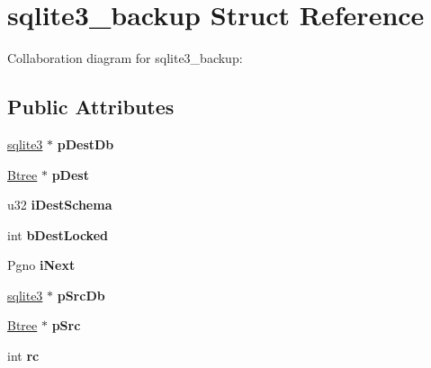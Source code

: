 \hypertarget{structsqlite3__backup}{\section{sqlite3\+\_\+backup Struct Reference}
\label{structsqlite3__backup}
}


Collaboration diagram for sqlite3\+\_\+backup\+:
\subsection*{Public Attributes}
\begin{DoxyCompactItemize}
\item 
\hypertarget{structsqlite3__backup_ad9b5074a860e01b31bbf9cb27f3808d9}{\hyperlink{structsqlite3}{sqlite3} $\ast$ {\bfseries p\+Dest\+Db}}\label{structsqlite3__backup_ad9b5074a860e01b31bbf9cb27f3808d9}

\item 
\hypertarget{structsqlite3__backup_a9e011336a89274f0ebfefdcede198f71}{\hyperlink{struct_btree}{Btree} $\ast$ {\bfseries p\+Dest}}\label{structsqlite3__backup_a9e011336a89274f0ebfefdcede198f71}

\item 
\hypertarget{structsqlite3__backup_a3f294f50b4ef206452dddd14f2a7cf6a}{u32 {\bfseries i\+Dest\+Schema}}\label{structsqlite3__backup_a3f294f50b4ef206452dddd14f2a7cf6a}

\item 
\hypertarget{structsqlite3__backup_aa0d385678bc5c3fd4da4201ff03a5856}{int {\bfseries b\+Dest\+Locked}}\label{structsqlite3__backup_aa0d385678bc5c3fd4da4201ff03a5856}

\item 
\hypertarget{structsqlite3__backup_a92454bf354f928aade2b2f92e6cfd088}{Pgno {\bfseries i\+Next}}\label{structsqlite3__backup_a92454bf354f928aade2b2f92e6cfd088}

\item 
\hypertarget{structsqlite3__backup_a0bcc0528bb3f5ec52eb40c3e7a4f7adc}{\hyperlink{structsqlite3}{sqlite3} $\ast$ {\bfseries p\+Src\+Db}}\label{structsqlite3__backup_a0bcc0528bb3f5ec52eb40c3e7a4f7adc}

\item 
\hypertarget{structsqlite3__backup_aa48f873d1de446638ff71fdae606e672}{\hyperlink{struct_btree}{Btree} $\ast$ {\bfseries p\+Src}}\label{structsqlite3__backup_aa48f873d1de446638ff71fdae606e672}

\item 
\hypertarget{structsqlite3__backup_aab860dbed6181702b4c6b80d43cde411}{int {\bfseries rc}}\label{structsqlite3__backup_aab860dbed6181702b4c6b80d43cde411}


\end{DoxyCompactItemize}
